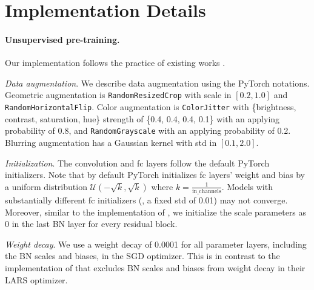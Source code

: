 \documentclass[final]{cvpr}
\begin{document}
{\small
{}
\renewcommand\UrlFont{\color{Gray}\rmfamily}


}

\newpage

\renewcommand\thefigure{\thesection.\arabic{figure}}
\renewcommand\thetable{\thesection.\arabic{table}}
\setcounter{figure}{0} 
\setcounter{table}{0} 

\appendix

\section{Implementation Details}

\paragraph{Unsupervised pre-training.} Our implementation follows the practice of existing works \cite{Wu2018a,He2019a,Chen2020,Chen2020a,Grill2020}.

\emph{Data augmentation}. We describe data augmentation using the PyTorch \cite{Paszke2019} notations. Geometric augmentation is \texttt{RandomResizedCrop} with scale in $[0.2, 1.0]$ \cite{Wu2018a} and \texttt{RandomHorizontalFlip}. Color augmentation is \texttt{ColorJitter} with \{brightness, contrast, saturation, hue\} strength of \{0.4, 0.4, 0.4, 0.1\} with an applying probability of 0.8, and \texttt{RandomGrayscale} with an applying probability of 0.2. Blurring augmentation \cite{Chen2020} has a Gaussian kernel with std in $[0.1, 2.0]$.

\emph{Initialization}. The convolution and fc layers follow the default PyTorch initializers. Note that by default PyTorch initializes fc layers' weight and bias by a uniform distribution $\mathcal{U}(-\sqrt{k}, \sqrt{k})$ where $k{=}\frac{1}{\text{in\_channels}}$. Models with substantially different fc initializers (\eg, a fixed std of 0.01) may not converge. Moreover, similar to the implementation of \cite{Chen2020}, we initialize the scale parameters as 0 \cite{Goyal2017} in the last BN layer for every residual block.

\emph{Weight decay}. We use a weight decay of 0.0001 for all parameter layers, including the BN scales and biases, in the SGD optimizer. This is in contrast to the implementation of \cite{Chen2020,Grill2020} that excludes BN scales and biases from weight decay in their LARS optimizer.
\end{document}
